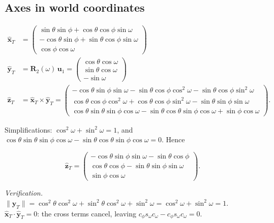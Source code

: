 \documentclass[12pt,a4paper]{article}
\newcommand{\uva}{\mathbf{u}_1}
\newcommand{\cross}{\times}
\newcommand{\Rd}{\mathbf{R}}
\newcommand{\Rtwo}{\Rd_2}
\begin{document}
\subsection{Axes in world coordinates}

\begin{align}
  \hat{\mathbf{x}}_T &=
  \begin{pmatrix}
      \sin\theta\sin\phi + \cos\theta\cos\phi\sin\omega \\
      -\cos\theta\sin\phi + \sin\theta\cos\phi\sin\omega \\
      \cos\phi\cos\omega
  \end{pmatrix}
  \label{eq:xt} \\[12pt]
  \hat{\mathbf{y}}_T &=
  \Rtwo(\omega)\,\uva
  = \begin{pmatrix}
      \cos\theta\cos\omega \\
      \sin\theta\cos\omega \\
      -\sin\omega
  \end{pmatrix}
  \label{eq:yt} \\[12pt]
  \hat{\mathbf{z}}_T &= \hat{\mathbf{x}}_T \cross \hat{\mathbf{y}}_T
  = \begin{pmatrix}
      -\cos\theta\sin\phi\sin\omega - \sin\theta\cos\phi\cos^2\omega
        - \sin\theta\cos\phi\sin^2\omega \\[2pt]
      \cos\theta\cos\phi\cos^2\omega + \cos\theta\cos\phi\sin^2\omega
        - \sin\theta\sin\phi\sin\omega \\[2pt]
      \cos\theta\sin\theta\sin\phi\cos\omega
        - \sin\theta\cos\theta\sin\phi\cos\omega + \sin\phi\cos\omega
  \end{pmatrix}.
  \label{eq:zt}
\end{align}

Simplifications: $\cos^2\omega+\sin^2\omega=1$, and
$\cos\theta\sin\theta\sin\phi\cos\omega - \sin\theta\cos\theta\sin\phi\cos\omega = 0$.
Hence

\begin{equation}
  \boxed{
  \hat{\mathbf{z}}_T
  = \begin{pmatrix}
      -\cos\theta\sin\phi\sin\omega - \sin\theta\cos\phi \\[2pt]
      \cos\theta\cos\phi - \sin\theta\sin\phi\sin\omega \\[2pt]
      \sin\phi\cos\omega
  \end{pmatrix}}.
  \label{eq:zt-simple}
\end{equation}

\noindent\textit{Verification.}
$\|\hat{\mathbf{y}}_T\| = \cos^2\theta\cos^2\omega + \sin^2\theta\cos^2\omega
+ \sin^2\omega = \cos^2\omega + \sin^2\omega = 1$. 
$\hat{\mathbf{x}}_T \cdot \hat{\mathbf{y}}_T = 0$: the cross terms cancel,
leaving $c_\phi s_\omega c_\omega - c_\phi s_\omega c_\omega = 0$. 
\end{document}
